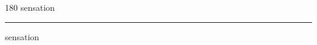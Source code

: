 
\begin{frame}
\begin{center}
\begin{turn}{180}
{\fontsize{2.5cm}{1em}\selectfont sensation}
\end{turn}
\vspace{1em}\par  
\hrule
\vspace{1em}\par  
{\fontsize{2.5cm}{1em}\selectfont sensation}
\end{center}
\end{frame}
